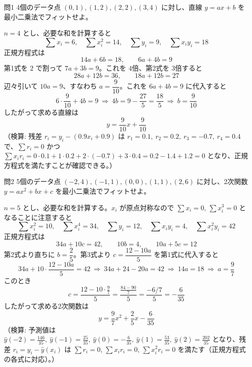\documentclass[a4paper,11pt]{article}
\begin{document}
\clearpage
\begin{mondaiboxS}{問1}
4個のデータ点 $(0,1),(1,2),(2,2),(3,4)$ に対し、直線 $y=ax+b$ を最小二乗法でフィットせよ。
\end{mondaiboxS}
\kaitou
$n=4$ とし、必要な和を計算すると
\[
\sum x_i = 6,\quad \sum x_i^2 = 14,\quad \sum y_i = 9,\quad \sum x_i y_i = 18
\]
正規方程式は
\[
14a + 6b = 18, \qquad 6a + 4b = 9
\]
第1式を $2$ で割って $7a+3b=9$。これを $4$倍、第2式を $3$倍すると
\[
28a+12b=36, \qquad 18a+12b=27
\]
辺々引いて $10a = 9$、すなわち $a = \dfrac{9}{10}$。これを $6a+4b=9$ に代入すると
\[
6\cdot\frac{9}{10} + 4b = 9 \ \Longrightarrow\ 4b = 9 - \frac{27}{5} = \frac{18}{5} \ \Longrightarrow\ b = \frac{9}{10}
\]
したがって求める直線は
\[
\boxed{\; y = \frac{9}{10}x + \frac{9}{10} \;}
\]
（検算: 残差 $r_i = y_i - (0.9x_i+0.9)$ は $r_1=0.1,\ r_2=0.2,\ r_3=-0.7,\ r_4=0.4$ で、$\sum r_i = 0$ かつ $\sum x_i r_i = 0\cdot0.1+1\cdot0.2+2\cdot(-0.7)+3\cdot0.4=0.2-1.4+1.2=0$ となり、正規方程式を満たすことが確認できる。）

\clearpage
\begin{mondaiboxS}{問2}
5個のデータ点 $(-2,4),(-1,1),(0,0),(1,1),(2,6)$ に対し、2次関数 $y=ax^2+bx+c$ を最小二乗法でフィットせよ。
\end{mondaiboxS}
\kaitou
$n=5$ とし、必要な和を計算する。$x_i$ が原点対称なので $\sum x_i = 0$, $\sum x_i^3 = 0$ となることに注意すると
\[
\sum x_i^2 = 10,\quad \sum x_i^4 = 34,\quad \sum y_i = 12,\quad \sum x_i y_i = 4,\quad \sum x_i^2 y_i = 42
\]
正規方程式は
\[
34a + 10c = 42, \qquad 10b = 4, \qquad 10a + 5c = 12
\]
第2式より直ちに $b = \dfrac{2}{5}$。第3式より $c = \dfrac{12 - 10a}{5}$ を第1式に代入すると
\[
34a + 10\cdot\frac{12-10a}{5} = 42 \ \Longrightarrow\ 34a + 24 - 20a = 42 \ \Longrightarrow\ 14a = 18 \ \Longrightarrow\ a = \frac{9}{7}
\]
このとき
\[
c = \frac{12 - 10\cdot\frac{9}{7}}{5} = \frac{\frac{84-90}{7}}{5} = \frac{-6/7}{5} = -\frac{6}{35}
\]
したがって求める2次関数は
\[
\boxed{\; y = \frac{9}{7}x^2 + \frac{2}{5}x - \frac{6}{35} \;}
\]
（検算: 予測値は $\hat y(-2)=\frac{146}{35},\ \hat y(-1)=\frac{25}{35},\ \hat y(0)=-\frac{6}{35},\ \hat y(1)=\frac{53}{35},\ \hat y(2)=\frac{202}{35}$ となり、残差 $r_i=y_i-\hat y(x_i)$ は $\sum r_i = 0$, $\sum x_i r_i = 0$, $\sum x_i^2 r_i = 0$ を満たす（正規方程式の各式に対応）。）
\end{document}
